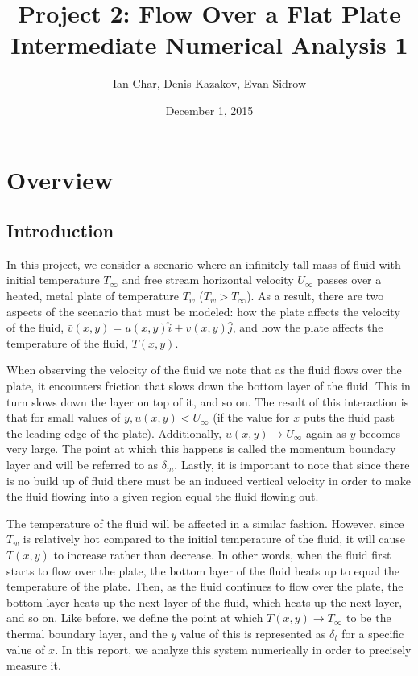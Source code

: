 \documentclass[12pt]{article}\pagestyle{myheadings}
\title{Project 2: Flow Over a Flat Plate \\ Intermediate Numerical Analysis 1}
\author{Ian Char, Denis Kazakov, Evan Sidrow}
\date{December 1, 2015}
\theoremstyle{plain}
\begin{document}
\maketitle
\section{Overview}

\subsection{Introduction}

In this project, we consider a scenario where an infinitely tall mass of fluid with initial temperature $T_{\infty}$ and free stream horizontal velocity $U_{\infty}$ passes over a heated, metal plate of temperature $T_w$ ($T_w > T_{\infty}$). As a result, there are two aspects of the scenario that must be modeled: how the plate affects the velocity of the fluid, $\bar{v}(x,y) = u(x,y) \hat{i} + v(x,y) \hat{j}$, and how the plate affects the temperature of the fluid, $T(x,y)$.\vspace{5mm}

When observing the velocity of the fluid we note that as the fluid flows over the plate, it encounters friction that slows down the bottom layer of the fluid. This in turn slows down the layer on top of it, and so on. The result of this interaction is that for small values of $y, u(x, y) < U_{\infty}$ (if the value for $x$ puts the fluid past the leading edge of the plate). Additionally, $u(x, y) \rightarrow U_{\infty}$ again as $y$ becomes very large. The point at which this happens is called the momentum boundary layer and will be referred to as $\delta_m$. Lastly, it is important to note that since there is no build up of fluid there must be an induced vertical velocity in order to make the fluid flowing into a given region equal the fluid flowing out. \vspace{5mm}

The temperature of the fluid will be affected in a similar fashion. However, since $T_{w}$ is relatively hot compared to the initial temperature of the fluid, it will cause $T(x,y)$ to increase rather than decrease. In other words, when the fluid first starts to flow over the plate, the bottom layer of the fluid heats up to equal the temperature of the plate. Then, as the fluid continues to flow over the plate, the bottom layer heats up the next layer of the fluid, which heats up the next layer, and so on. Like before, we define the point at which $T(x,y) \rightarrow T_{\infty}$ to be the thermal boundary layer, and the $y$ value of this is represented as $\delta_t$ for a specific value of $x$. In this report, we analyze this system numerically in order to precisely measure it.
\end{document}

